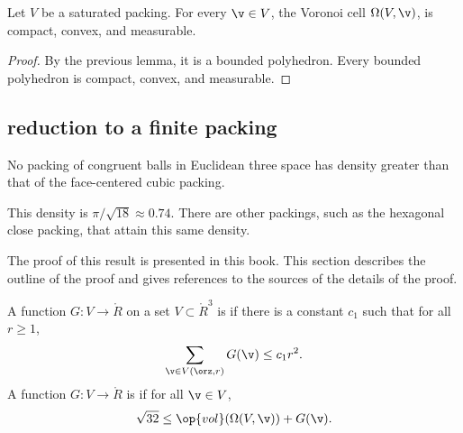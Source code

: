 \begin{lemma}[] 
Let $ V$ be a saturated packing.  For every $\v\in  V$, 
the Voronoi cell $\Omega( V,\v)$,  is
compact, convex, and measurable.
\end{lemma}

\begin{proof}  By the previous lemma, it is a bounded polyhedron.  Every bounded
polyhedron is compact, convex, and measurable.
\end{proof}




\subsection{reduction to a finite packing}


\begin{theorem} 
\label{theorem:kepler}   
%
No packing of congruent balls in
Euclidean three space has density greater than that of the
face-centered cubic packing.
\end{theorem}

\begin{remark}
This density is $\pi/\sqrt{18}\approx 0.74.$  There are other
packings, such as the hexagonal close packing, that attain this
same density.
\end{remark}

The proof of this result is presented in this book. This section
describes the outline of the proof and gives references to
the sources of the details of the proof.



\begin{definition}\label{def:negligible}
A function $G:V\to \ring{R}$ on a set $V\subset\ring{R}^3$
is 
if there is a constant $c_1$ such that for all $r\ge1$,
\begin{displaymath}\sum_{\v\in V(\orz,r)} G(\v) \le c_1
r^2.\end{displaymath}
A function $G: V\to\ring{R}$ is
if for all $\v\in V$, 
\begin{displaymath}\sqrt{32}\le \op{vol}(\Omega(V,\v)) +
G(\v).\end{displaymath}
%
%
%
\end{definition}


